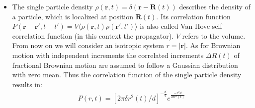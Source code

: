 \documentclass[
  a4paper,BCOR10mm,oneside,
  headsepline,footsepline,%
  fleqn,openbib
]{scrbook}
\begin{document}
\begin{itemize}
 \item The single particle density $\rho(\bm{r},t)=\delta(\bm{r}-\bm{R}(t))$ describes the density of a particle, which is localized at position $\bm{R}(t)$. Its correlation function $P(\bm{r}-\bm{r}',t-t')= V\langle\rho(\bm{r},t) \rho(\bm{r}',t')\rangle$ is also called Van Hove self-correlation function (in this context the propagator). $V$ refers to the volume. From now on we will consider an isotropic system $ r= |\bm{r}|$. As for Brownian motion with independent increments the correlated increments  $\Delta R(t)$ of fractional Brownian motion are assumed to follow a Gaussian distribution with zero mean. Thus the correlation function of the single particle density results in:
\begin{align}
 P(r,t)=[2 \pi \delta r^{2}(t)/d]^{-\frac{d}{2}} e^{ \frac{-r^2 d}{2 \delta r^{2}(t) }}
\end{align}


\end{itemize}
\end{document}
